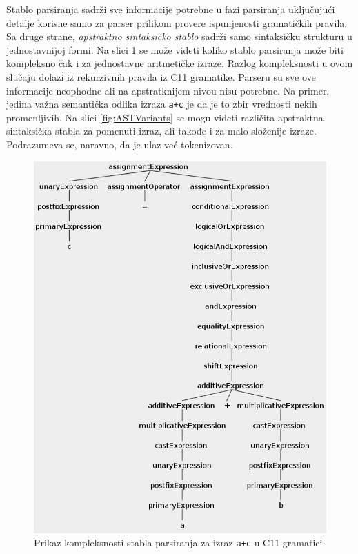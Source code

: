 Stablo parsiranja sadrži sve informacije potrebne u fazi parsiranja uključujući detalje korisne samo za parser prilikom provere ispunjenosti gramatičkih pravila. Sa druge strane, \emph{apstraktno sintaksičko stablo} sadrži samo sintaksičku strukturu u jednostavnijoj formi. Na slici \ref{fig:CompilationProcessPars1} se može videti koliko stablo parsiranja može biti kompleksno čak i za jednostavne aritmetičke izraze. Razlog kompleksnosti u ovom slučaju dolazi iz rekurzivnih pravila iz C11 gramatike. Parseru su sve ove informacije neophodne ali na apstratknijem nivou nisu potrebne. Na primer, jedina važna semantička odlika izraza \texttt{a+c} je da je to zbir vrednosti nekih promenljivih. Na slici \ref{fig:ASTVariants} se mogu videti različita apstraktna sintaksička stabla za pomenuti izraz, ali takođe i za malo složenije izraze. Podrazumeva se, naravno, da je ulaz već tokenizovan. 

\begin{figure}[h!]
\centering
\includegraphics[scale=0.55]{images/parse_tree_expr.png}
\caption{Prikaz kompleksnosti stabla parsiranja za izraz 
\texttt{a+c} u C11 gramatici.} 
\label{fig:CompilationProcessPars1}
\end{figure}


